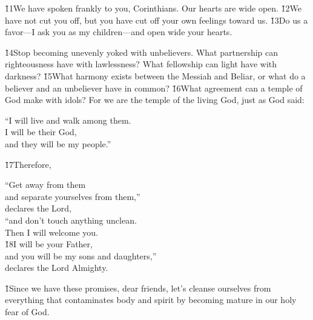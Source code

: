 \v{11}We have spoken frankly to you, Corinthians. Our hearts are wide open. \v{12}We have not cut you off, but you have cut off your own feelings toward us. \v{13}Do us a favor---I ask you as my children---and open wide your hearts.

\v{14}Stop becoming unevenly yoked with unbelievers. What partnership can righteousness have with lawlessness? What fellowship can light have with darkness? \v{15}What harmony exists between the Messiah and Beliar, or what do a believer and an unbeliever have in common? \v{16}What agreement can a temple of God make with idols? For we are the temple of the living God, just as God said:

\begin{poetry}
\poeml ``I will live and walk among them. \\
\poemll    I will be their God, \\
\poemlll       and they will be my people.''
\end{poetry}

\v{17}Therefore,

\begin{poetry}
\poeml ``Get away from them \\
\poemll    and separate yourselves from them,'' \\
\poemlll       declares the Lord, \\
\poeml ``and don't touch anything unclean. \\
\poemll    Then I will welcome you. \\
\poeml \v{18}I will be your Father, \\
\poemll    and you will be my sons and daughters,'' \\
\poemlll       declares the Lord Almighty.
\end{poetry}

\v{1}Since we have these promises, dear friends, let's cleanse ourselves from everything that contaminates body and spirit by becoming mature in our holy fear of God.

